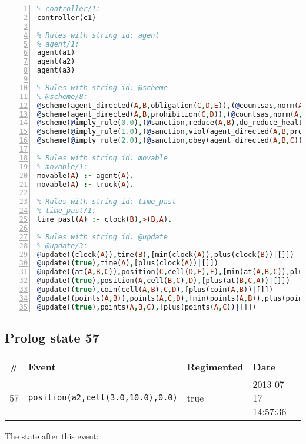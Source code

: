 \documentclass[11pt]{article}\usepackage[utf8]{inputenc}\usepackage{geometry}
\begin{document}
\begin{lstlisting}[language=Prolog, numbers=left]
% Rules with string id: controller
% controller/1:
controller(c1)

% Rules with string id: agent
% agent/1:
agent(a1)
agent(a2)
agent(a3)

% Rules with string id: @scheme
% @scheme/8:
@scheme(agent_directed(A,B,obligation(C,D,E)),(@countsas,norm(A,B,F,obligation(C,D,E)),F),false,(listTrue(C)),(time_past(D)),false,[plus(viol(agent_directed(A,B,obligation(C,D,E))))|[]],[plus(obey(agent_directed(A,B,obligation(C,D,E))))|[]])
@scheme(agent_directed(A,B,prohibition(C,D)),(@countsas,norm(A,B,E,prohibition(C,D)),E),(listTrue(C)),false,(false),false,[plus(viol(agent_directed(A,B,prohibition(C,D))))|[]],[plus(obey(agent_directed(A,B,prohibition(C,D))))|[]])
@scheme(@imply_rule(0.0),(@sanction,reduce(A,B),do_reduce_health(A,B),notifyAgent(A,changed(status))),true,false,false,false,[min(reduce(A,B))|[]],[])
@scheme(@imply_rule(1.0),(@sanction,viol(agent_directed(A,B,prohibition(C,D))),do_sanction(D)),true,false,false,false,[min(viol(agent_directed(A,B,prohibition(C,D))))|[]],[])
@scheme(@imply_rule(2.0),(@sanction,obey(agent_directed(A,B,C))),true,false,false,false,[min(obey(agent_directed(A,B,C)))|[]],[])

% Rules with string id: movable
% movable/1:
movable(A) :- agent(A).
movable(A) :- truck(A).

% Rules with string id: time_past
% time_past/1:
time_past(A) :- clock(B),>(B,A).

% Rules with string id: @update
% @update/3:
@update((clock(A)),time(B),[min(clock(A)),plus(clock(B))|[]])
@update((true),time(A),[plus(clock(A))|[]])
@update((at(A,B,C)),position(C,cell(D,E),F),[min(at(A,B,C)),plus(at(D,E,C))|[]])
@update((true),position(A,cell(B,C),D),[plus(at(B,C,A))|[]])
@update((true),coin(cell(A,B),C,D),[plus(coin(A,B))|[]])
@update((points(A,B)),points(A,C,D),[min(points(A,B)),plus(points(A,D))|[]])
@update((true),points(A,B,C),[plus(points(A,C))|[]])

\end{lstlisting}
\clearpage 
\subsection{Prolog state 57}
\begin{table}[ht]
\centering 
\begin{tabular}{l l l l} 
\textbf{\#} & \textbf{Event} & \textbf{Regimented} & \textbf{Date} \\ [0.5ex] 
\hline
57&\texttt{position(a2,cell(3.0,10.0),0.0)}&true&2013-07-17 14:57:36\\ [1ex] \hline\end{tabular}
\end{table}
The state after this event:
\end{document}
